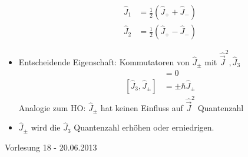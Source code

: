 \documentclass[10pt,article,colorback,accentcolor=tud9d]{scrartcl}
\begin{document}
\begin{itemize}
\begin{align}
    \hat{J}_1&=\frac{1}{2}(\hat{J}_++\hat{J}_-)\\
    \hat{J}_2&=\frac{1}{2}(\hat{J}_+-\hat{J}_-)
    \end{align}
  \item Entscheidende Eigenschaft: Kommutatoren von $\hat{J}_\pm$ mit $\hat{\vec{J}}^2,\hat{J}_3$
    \begin{align}
    [\hat{\vec{J}}^2,\hat{J}_\pm]&=0\\
    [\hat{J}_3,\hat{J}_\pm]&=\pm \hbar \hat{J}_\pm
    \end{align}
    Analogie zum HO: $\hat{J}_\pm$ hat keinen Einfluss auf $\hat{\vec{J}}^2$ Quantenzahl
  \item $\hat{J}_\pm$ wird die $\hat{J}_3$ Quantenzahl erhöhen oder erniedrigen.
\end{itemize}


\begin{flushright}
Vorlesung 18 - 20.06.2013
\end{flushright}
\end{document}
